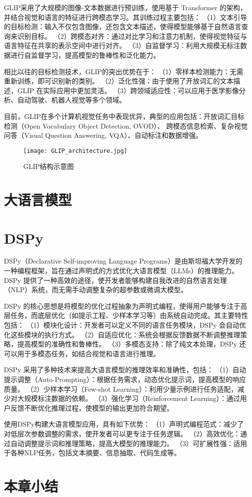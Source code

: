 GLIP采用了大规模的图像-文本数据进行预训练，使用基于 Transformer 的架构，并结合视觉和语言的特征进行跨模态学习。其训练过程主要包括：
（1）文本引导的目标检测：输入不仅包含图像，还包含文本描述，使得模型能够基于自然语言查询来识别目标。
（2）跨模态对齐：通过对比学习和注意力机制，使得视觉特征与语言特征在共享的表示空间中进行对齐。
（3）自监督学习：利用大规模无标注数据进行自监督学习，提高模型的鲁棒性和泛化能力。

相比以往的目标检测技术，GLIP的突出优势在于：
（1）零样本检测能力：无需重新训练，即可识别新的类别。
（2）泛化性强：由于使用了开放词汇的文本描述，GLIP 在实际应用中更加灵活。
（3）跨领域适应性：可以应用于医学影像分析、自动驾驶、机器人视觉等多个领域。

目前，GLIP在多个计算机视觉任务中表现优异，典型的应用包括：开放词汇目标检测（Open Vocabulary Object Detection, OVOD）、
跨模态信息检索、复杂视觉问答（Visual Question Answering, VQA）、自动标注和数据增强。

\begin{figure}
    \centering
    \texttt{[image: GLIP\_architecture.jpg]}
    \caption{GLIP结构示意图\label{GLIP_architecture}}
\end{figure}

\section{大语言模型}

\section{DSPy}
DSPy（Declarative Self-improving Language Programs）是由斯坦福大学开发的一种编程框架，旨在通过声明式的方式优化大语言模型（LLMs）的推理能力。DSPy 提供了一种高效的途径，使开发者能够构建自我改进的自然语言处理（NLP）系统，而无需手动调整复杂的超参数或微调大模型。

DSPy 的核心思想是将模型的优化过程抽象为声明式编程，使得用户能够专注于高层任务，而底层优化（如提示工程、少样本学习等）由系统自动完成。其主要特性包括：
（1）模块化设计：开发者可以定义不同的语言任务模块，DSPy 会自动优化这些模块的执行方式。
（2）自适应优化：系统会根据反馈数据不断调整推理策略，提高模型的准确性和鲁棒性。
（3）多模态支持：除了纯文本处理，DSPy 还可以用于多模态任务，如结合视觉和语言进行推理。

DSPy 采用了多种技术来提高大语言模型的推理效率和准确性，包括：
（1）自动提示调整（Auto-Prompting）：根据任务需求，动态优化提示词，提高模型的响应质量。
（2）少样本学习（Few-shot Learning）：利用少量示例进行任务适配，减少对大规模标注数据的依赖。
（3）强化学习（Reinforcement Learning）：通过用户反馈不断优化推理过程，使模型的输出更加符合期望。

使用DSPy构建大语言模型应用，具有如下优势：
（1）声明式编程范式：减少了对低层次参数调整的需求，使开发者可以更专注于任务逻辑。
（2）高效优化：通过自动调整提示词和推理策略，提高大模型的推理能力。
（3）可扩展性强：适用于各种NLP任务，包括文本摘要、信息抽取、代码生成等。

\section{本章小结}